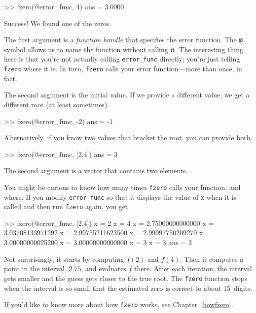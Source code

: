 \begin{code}
>> fzero(@error_func, 4)
ans = 3.0000
\end{code}

Success!  We found one of the zeros.

The first argument is a \emph{function handle} that specifies
the error function.  The \lstinline{@} symbol allows us to name the
function without calling it.  The interesting thing here is
that you're not actually calling \lstinline{error_func} directly;
you're just telling \lstinline{fzero} where it is.  In turn, \lstinline{fzero}
calls your error function---more than once, in fact.


The second argument is the initial value.  If we provide a different
value, we get a different root (at least sometimes).

\begin{code}
>> fzero(@error_func, -2)
ans = -1
\end{code}

Alternatively, if you know two values that bracket the root,
you can provide both.

\begin{code}
>> fzero(@error_func, [2,4])
ans = 3
\end{code}

The second argument is a vector that contains two elements.


You might be curious to know how many times \lstinline{fzero} calls your
function, and where.  If you modify \lstinline{error_func} so that it displays
the value of \lstinline{x} when it is called and then run \lstinline{fzero}
again, you get

\begin{code}
>> fzero(@error_func, [2,4])
x = 2
x = 4
x = 2.75000000000000
x = 3.03708133971292
x = 2.99755211623500
x = 2.99997750209270
x = 3.00000000025200
x = 3.00000000000000
x = 3
x = 3
ans = 3
\end{code}

Not surprisingly, it starts by computing $f(2)$ and $f(4)$.  Then it computes a point in the interval, $2.75$, and evaluates $f$ there.  After each iteration, the interval gets smaller and the guess gets closer to the true root.
The \lstinline{fzero} function stops when the interval is so small that the estimated
zero is correct to about 15~digits.

If you'd like to know more about how \lstinline{fzero} works, see Chapter~\ref{howfzero}.


